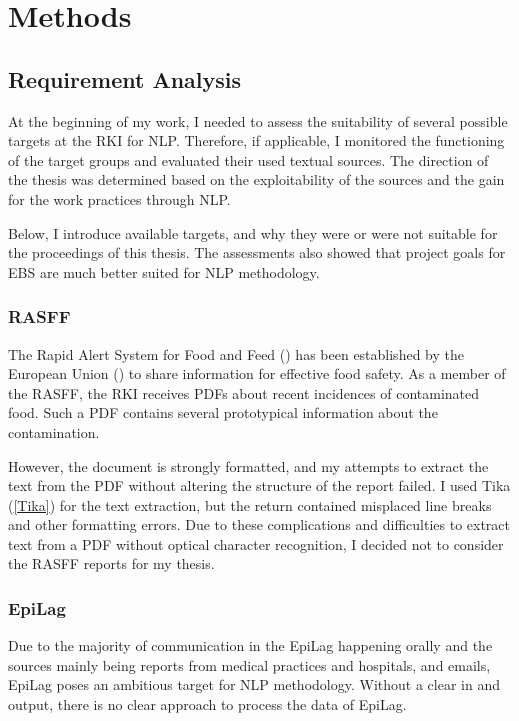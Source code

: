 \chapter{Methods}

\section{Requirement Analysis}
  At the beginning of my work, I needed to assess the suitability of several possible targets at the RKI for NLP.
  Therefore, if applicable, I monitored the functioning of the target groups and evaluated their used textual sources.
  The direction of the thesis was determined based on the exploitability of the sources and the gain for the work practices through NLP.

  Below, I introduce available targets, and why they were or were not suitable for the proceedings of this thesis. The assessments also showed that project goals for EBS are much better suited for NLP methodology.

\subsection{RASFF}
  The Rapid Alert System for Food and Feed () has been established by the European Union () to share information for effective food safety.
  As a member of the RASFF, the RKI receives PDFs about recent incidences of contaminated food.
  Such a PDF contains several prototypical information about the contamination.

  However, the document is strongly formatted, and my attempts to extract the text from the PDF without altering the structure of the report failed.
  I used Tika (\ref{Tika}) for the text extraction, but the return contained misplaced line breaks and other formatting errors.
  Due to these complications and difficulties to extract text from a PDF without optical character recognition, I decided not to consider the RASFF reports for my thesis.

\subsection{EpiLag}
  Due to the majority of communication in the EpiLag happening orally and the sources mainly being reports from medical practices and hospitals, and emails, EpiLag poses an ambitious target for NLP methodology.
  Without a clear in and output, there is no clear approach to process the data of EpiLag.

